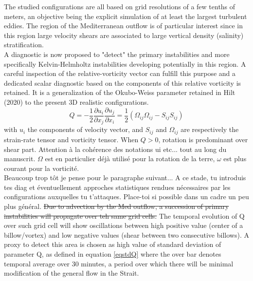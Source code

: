 \color{blue}The studied configurations are all based on grid resolutions of a few tenths of meters, an objective being the explicit simulation of at least the largest turbulent eddies. The region of the Mediterranean outflow is of particular interest since in this region large velocity shears are associated to large vertical density (salinity) stratification.\\
A diagnostic is now proposed to "detect" the primary instabilities and more specifically Kelvin-Helmholtz instabilities developing potentially in this region.
\color{blue} A careful inspection of the relative-vorticity vector can fulfill this purpose and a dedicated scalar diagnostic based on the components of this relative vorticity is retained. It is a generalization of the Okubo-Weiss parameter retained in Hilt (2020) to the present 3D realistic configurations. \color{black}
\begin{equation}
Q=-\frac{1}{2} \frac{\partial u_i}{\partial x_j} \frac{\partial u_j}{\partial x_i} = \frac{1}{2} (\Omega_{ij}\Omega_{ij} - S_{ij} S_{ij})
\end{equation}
with $u_i$ the components of velocity vector, and $S_{ij}$ and $\Omega_{ij}$ are respectively the strain-rate tensor and vorticity tensor. When $Q>0$, rotation is predominant over shear part.
 \color{green}Attention à la cohérence des notations ui etc... tout au long du manuscrit. $\Omega$ est en particulier déjà utilisé pour la rotation de la terre, $\omega$ est plus courant pour la vorticité.\color{black}\\

\color{green} Beaucoup trop tôt je pense pour le paragraphe suivant... A ce stade, tu introduis tes diag et éventuellement approches statistiques rendues nécessaires par les configurations auxquelles tu t'attaques. Place-toi si possible dans un cadre un peu plus général. \color{black}
\sout{Due to advection by the Med outflow, a succession of primary instabilities will propagate over teh same grid cells.} The temporal evolution of Q over such grid cell will show oscillations between high positive value (center of a billow/vortex) and low negative values (shear between two consecutive billows). A proxy to detect this area is chosen as high value of standard deviation of parameter Q, as defined in equation \ref{eqstdQ} where the over bar denotes temporal average over 30 minutes, a period over which there will be minimal modification of the general flow in the Strait.

